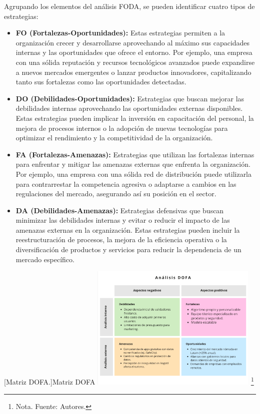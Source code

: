 Agrupando los elementos del análisis FODA, se pueden identificar cuatro tipos de estrategias:
\begin{itemize}
    \item \textbf{FO (Fortalezas-Oportunidades):} Estas estrategias permiten a la organización crecer y desarrollarse aprovechando al máximo sus capacidades internas y las oportunidades que ofrece el entorno. Por ejemplo, una empresa con una sólida reputación y recursos tecnológicos avanzados puede expandirse a nuevos mercados emergentes o lanzar productos innovadores, capitalizando tanto sus fortalezas como las oportunidades detectadas.
    \item \textbf{DO (Debilidades-Oportunidades):} Estrategias que buscan mejorar las debilidades internas aprovechando las oportunidades externas disponibles. Estas estrategias pueden implicar la inversión en capacitación del personal, la mejora de procesos internos o la adopción de nuevas tecnologías para optimizar el rendimiento y la competitividad de la organización.
    \item \textbf{FA (Fortalezas-Amenazas):} Estrategias que utilizan las fortalezas internas para enfrentar y mitigar las amenazas externas que enfrenta la organización. Por ejemplo, una empresa con una sólida red de distribución puede utilizarla para contrarrestar la competencia agresiva o adaptarse a cambios en las regulaciones del mercado, asegurando así su posición en el sector.
    \item \textbf{DA (Debilidades-Amenazas):} Estrategias defensivas que buscan minimizar las debilidades internas y evitar o reducir el impacto de las amenazas externas en la organización. Estas estrategias pueden incluir la reestructuración de procesos, la mejora de la eficiencia operativa o la diversificación de productos y servicios para reducir la dependencia de un mercado específico.
\end{itemize}

\begin{minipage}{0.9\textwidth}
\centering
{}[{Matriz DOFA.}]{Matriz DOFA}
\label{dofa}
\includegraphics[width=0.6\textwidth]{Content/Images/Matriz-dofa-proyecto.png}
\footnote{Nota. \textup{Fuente: Autores.}}
\end{minipage}
